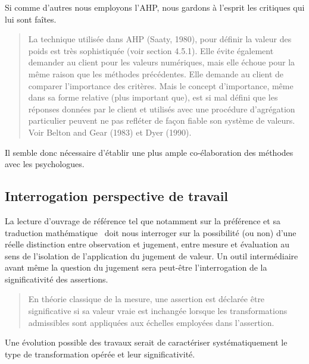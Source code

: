 Si comme d'autres nous employons l'\gls{AHP}, nous gardons à l'esprit les critiques qui lui sont faîtes.
\blockcquote{bouyssou_evaluation_2006}{
La technique utilisée dans AHP (Saaty, 1980), pour définir la valeur des poids est très sophistiquée (voir section 4.5.1).
Elle évite également demander au client pour les valeurs numériques, mais elle échoue pour la même raison que les méthodes précédentes.
Elle demande au client de comparer l'importance des critères. Mais le concept d'importance, même dans sa forme relative (plus important que), est si mal défini que les réponses données par le client et utilisés avec une procédure d'agrégation particulier peuvent ne pas refléter de façon fiable son système de valeurs.
Voir Belton and Gear (1983) et Dyer (1990).
}
Il semble donc nécessaire d'établir une plus ample co-élaboration des méthodes avec les psychologues.

\subsection{Interrogation perspective de travail}


La lecture d'ouvrage de référence tel que  notamment sur la préférence et sa traduction mathématique~ \cite[Chapitre 3]{bouyssou_evaluation_2006} doit nous interroger sur la possibilité (ou non) d'une réelle distinction entre observation et jugement, entre mesure et évaluation au sens de l'isolation de l'application du jugement de valeur.
Un outil intermédiaire avant même la question du jugement sera peut-être l'interrogation de la significativité des assertions.
\blockcquote[3.4. evaluation and meanigfulness]{bouyssou_evaluation_2006}{
En théorie classique de la mesure, une assertion est déclarée être significative si sa valeur vraie est inchangée lorsque les transformations admissibles sont appliquées aux échelles employées dans l'assertion.
}
Une évolution possible des travaux serait de caractériser systématiquement le type de transformation opérée et leur significativité.


